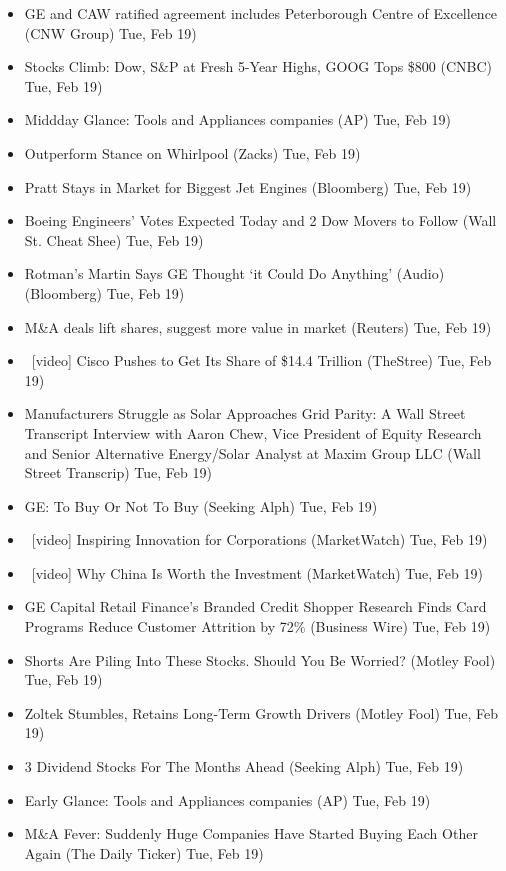 \documentclass[11pt,asymmetric]{article}
\begin{document}
\begin{itemize}
\item GE and CAW ratified agreement includes Peterborough Centre of Excellence (CNW Group) Tue, Feb 19)
\item Stocks Climb: Dow, S\&P at Fresh 5-Year Highs, GOOG Tops \$800 (CNBC) Tue, Feb 19)
\item Middday Glance: Tools and Appliances companies (AP) Tue, Feb 19)
\item Outperform Stance on Whirlpool (Zacks) Tue, Feb 19)
\item Pratt Stays in Market for Biggest Jet Engines (Bloomberg) Tue, Feb 19)
\item Boeing Engineers’ Votes Expected Today and 2 Dow Movers to Follow (Wall St. Cheat Shee) Tue, Feb 19)
\item Rotman’s Martin Says GE Thought ‘it Could Do Anything’ (Audio) (Bloomberg) Tue, Feb 19)
\item M\&A deals lift shares, suggest more value in market (Reuters) Tue, Feb 19)
\item\ [video] Cisco Pushes to Get Its Share of \$14.4 Trillion (TheStree) Tue, Feb 19)
\item Manufacturers Struggle as Solar Approaches Grid Parity: A Wall Street Transcript Interview with Aaron Chew, Vice President of Equity Research and Senior Alternative Energy/Solar Analyst at Maxim Group LLC (Wall Street Transcrip) Tue, Feb 19)
\item GE: To Buy Or Not To Buy (Seeking Alph) Tue, Feb 19)
\item\ [video] Inspiring Innovation for Corporations (MarketWatch) Tue, Feb 19)
\item\ [video] Why China Is Worth the Investment (MarketWatch) Tue, Feb 19)
\item GE Capital Retail Finance’s Branded Credit Shopper Research Finds Card Programs Reduce Customer Attrition by 72\% (Business Wire) Tue, Feb 19)
\item Shorts Are Piling Into These Stocks. Should You Be Worried? (Motley Fool) Tue, Feb 19)
\item Zoltek Stumbles, Retains Long-Term Growth Drivers (Motley Fool) Tue, Feb 19)
\item 3 Dividend Stocks For The Months Ahead (Seeking Alph) Tue, Feb 19)
\item Early Glance: Tools and Appliances companies (AP) Tue, Feb 19)
\item M\&A Fever: Suddenly Huge Companies Have Started Buying Each Other Again (The Daily Ticker) Tue, Feb 19)

\end{itemize}
\end{document}

